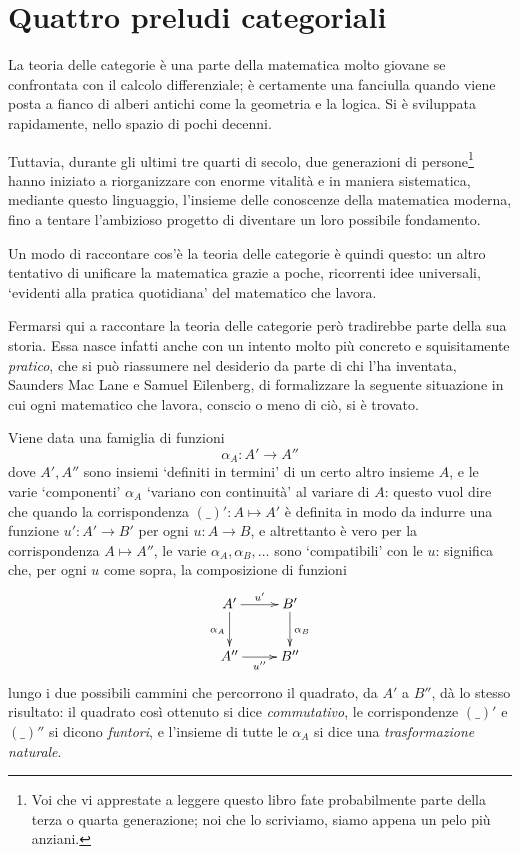 \chapter{Quattro preludi categoriali}
La teoria delle categorie è una parte della matematica molto giovane se confrontata con il calcolo differenziale; è certamente una fanciulla quando viene posta a fianco di alberi antichi come la geometria e la logica. Si è sviluppata rapidamente, nello spazio di pochi decenni.

Tuttavia, durante gli ultimi tre quarti di secolo, due generazioni di persone\footnote{Voi che vi apprestate a leggere questo libro fate probabilmente parte della terza o quarta generazione; noi che lo scriviamo, siamo appena un pelo più anziani.} hanno iniziato a riorganizzare  con enorme vitalità e in maniera sistematica, mediante questo linguaggio, l'insieme delle conoscenze della matematica moderna, fino a tentare l'ambizioso progetto di diventare un loro possibile fondamento.

\medskip
Un modo di raccontare cos'è la teoria delle categorie è quindi questo: un altro tentativo di unificare la matematica grazie a poche, ricorrenti idee universali, `evidenti alla pratica quotidiana' del matematico che lavora.

Fermarsi qui a raccontare la teoria delle categorie però tradirebbe parte della sua storia. Essa nasce infatti anche con un intento molto più concreto e squisitamente \emph{pratico}, che si può riassumere nel desiderio da parte di chi l'ha inventata, Saunders Mac Lane e Samuel Eilenberg, di formalizzare la seguente situazione in cui ogni matematico che lavora, conscio o meno di ciò, si è trovato.

Viene data una famiglia di funzioni
\[\alpha_A : A' \to A'' \]
dove \(A',A''\) sono insiemi `definiti in termini' di un certo altro insieme \(A\), e le varie `componenti' \(\alpha_A\) `variano con continuità' al variare di \(A\): questo vuol dire che quando la corrispondenza \((\_)' : A\mapsto A'\) è definita in modo da indurre una funzione \(u' : A' \to B'\) per ogni \(u : A \to B\), e altrettanto è vero per la corrispondenza \(A\mapsto A''\), le varie \(\alpha_A, \alpha_B,\dots\) sono `compatibili' con le \(u\): significa che, per ogni \(u\) come sopra, la composizione di funzioni
\[
	\vcenter{\xymatrix{
			A'\ar[r]^{u'}\ar[d]_{\alpha_A} & B'\ar[d]^{\alpha_B} \\
			A'' \ar[r]_{u''} & B''
		}}
\]
lungo i due possibili cammini che percorrono il quadrato, da \(A'\) a \(B''\), dà lo stesso risultato: il quadrato così ottenuto si dice \emph{commutativo}, le corrispondenze \((\_)'\) e \((\_)''\) si dicono \emph{funtori}, e l'insieme di tutte le \(\alpha_A\) si dice una \emph{trasformazione naturale}.


